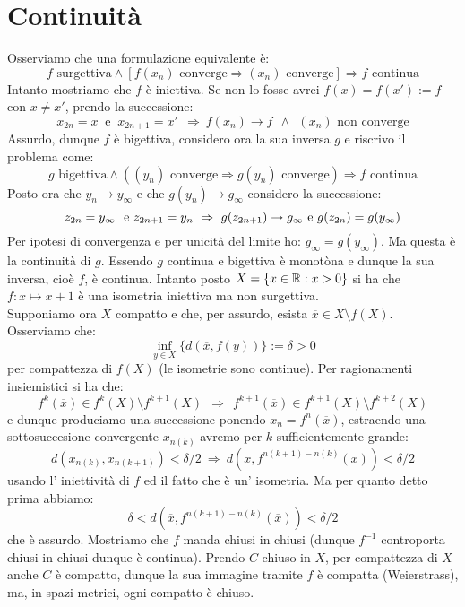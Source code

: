 \section{Continuità}

 Osserviamo che una formulazione equivalente è:
$$ f\mbox{ surgettiva} \wedge \left[ f(x_n)\mbox{ converge} \Rightarrow (x_n) \mbox{ converge} \right] \Rightarrow f \mbox{ continua} $$
Intanto mostriamo che $f$ è iniettiva. Se non lo fosse avrei $f(x)=f(x'):=f$ con $x\neq x'$, prendo la successione:
$$ x_{2n}=x\ \mbox{ e }\ x_{2n+1}=x'\ \ \Rightarrow\ f(x_n)\rightarrow f\ \  \wedge\ \ (x_n) \mbox{ non converge} $$
Assurdo, dunque $f$ è bigettiva, considero ora la sua inversa $g$ e riscrivo il problema come:
$$ g\mbox{ bigettiva} \wedge \left( (y_n)\mbox{ converge} \Rightarrow g(y_n) \mbox{ converge} \right) \Rightarrow f \mbox{ continua} $$
Posto ora che $y_n\rightarrow y_{\infty}$ e che $g(y_n)\rightarrow g_{\infty}$ considero la successione:
$$ z_{2n}=y_{\infty}\  \mbox{ e}\  z_{2n+1}=y_n\ \Rightarrow\  g(z_{2n+1})\rightarrow g_{\infty}\\ \mbox{ e}\  g(z_{2n})=g(y_{\infty}) $$
Per ipotesi di convergenza e per unicità del limite ho: $ g_{\infty}=g(y_{\infty})$. Ma questa è la continuità di $g$. Essendo $g$ continua e bigettiva è monotòna e dunque la sua inversa, cioè $f$, è continua.
 Intanto posto $X=\{x\in \mathbb{R} : x>0\}$ si ha che $f: x\mapsto x+1$ è una isometria iniettiva ma non surgettiva.\\
Supponiamo ora $X$ compatto e che, per assurdo, esista $\overline{x}\in X\setminus f(X)$. Osserviamo che:
$$
\inf_{y\in X}\{d(\overline{x},f(y))\}:=\delta>0
$$
per compattezza di $f(X)$ (le isometrie sono continue). Per ragionamenti insiemistici si ha che:
$$
f^k(\overline{x}) \in f^k(X)\setminus f^{k+1}(X)\ \ \Rightarrow \ \ f^{k+1}(\overline{x}) \in f^{k+1}(X)\setminus f^{k+2}(X)
$$
e dunque produciamo una successione ponendo $x_n=f^{n}(\overline{x})$, estraendo una sottosuccesione convergente $x_{n(k)}$ avremo per $k$ sufficientemente grande:
$$
d(x_{n(k)},x_{n(k+1)})<\delta /2 \ \Rightarrow \ d(\overline{x}, f^{n(k+1)-n(k)}(\overline{x}))<\delta /2
$$
usando l' iniettività di $f$ ed il fatto che è un' isometria. Ma per quanto detto prima abbiamo:
$$
\delta < d(\overline{x}, f^{n(k+1)-n(k)}(\overline{x}))<\delta /2
$$ 
che è assurdo.
Mostriamo che $f$ manda chiusi in chiusi (dunque $f^{-1}$ controporta chiusi in chiusi dunque è continua). Prendo $C$ chiuso in $X$, per compattezza di $X$ anche $C$ è compatto, dunque la sua immagine tramite $f$ è compatta (Weierstrass), ma, in spazi metrici, ogni compatto è chiuso. 

